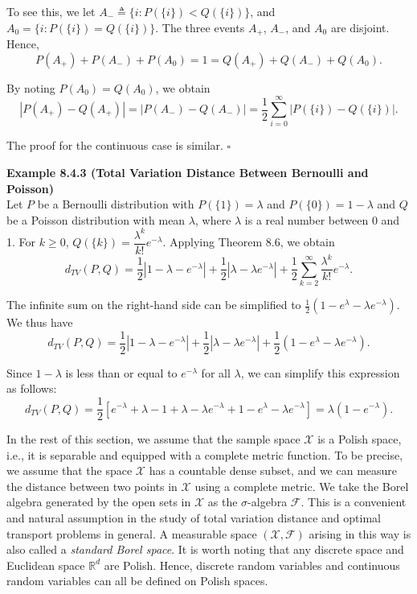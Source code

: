 To see this, we let $A_-\triangleq \{i : P(\{i\})<Q(\{i\})\}$, and $A_0=\{i : P(\{i\})=Q(\{i\})\}$. The three events $A_+$, $A_-$, and $A_0$ are disjoint. Hence,
\[
P(A_+)+P(A_-)+P(A_0)=1=Q(A_+)+Q(A_-)+Q(A_0).
\]

By noting $P(A_0)=Q(A_0)$, we obtain
\[
|P(A_+)-Q(A_+)| = |P(A_-)-Q(A_-)| = \frac{1}{2}\sum_{i=0}^{\infty} |P(\{i\})-Q(\{i\})|.
\]

The proof for the continuous case is similar. \hfill $\square$

\textbf{Example 8.4.3 (Total Variation Distance Between Bernoulli and Poisson)} \\
Let $P$ be a Bernoulli distribution with $P(\{1\})=\lambda$ and $P(\{0\})=1-\lambda$ and $Q$ be a Poisson distribution with mean $\lambda$, where $\lambda$ is a real number between 0 and 1. For $k\ge 0$, $Q(\{k\})=\dfrac{\lambda^k}{k!}e^{-\lambda}$. Applying Theorem 8.6, we obtain
\[
d_{TV}(P,Q)
=
\frac{1}{2}|1-\lambda-e^{-\lambda}|
+
\frac{1}{2}|\lambda-\lambda e^{-\lambda}|
+
\frac{1}{2}\sum_{k=2}^{\infty} \frac{\lambda^k}{k!}e^{-\lambda}.
\]

The infinite sum on the right-hand side can be simplified to $\frac{1}{2}(1-e^{\lambda}-\lambda e^{-\lambda})$. We thus have
\[
d_{TV}(P,Q)
=
\frac{1}{2}|1-\lambda-e^{-\lambda}|
+
\frac{1}{2}|\lambda-\lambda e^{-\lambda}|
+
\frac{1}{2}(1-e^{\lambda}-\lambda e^{-\lambda}).
\]

Since $1-\lambda$ is less than or equal to $e^{-\lambda}$ for all $\lambda$, we can simplify this expression as follows:
\[
d_{TV}(P,Q)
=
\frac{1}{2}\left[e^{-\lambda}+\lambda-1+\lambda-\lambda e^{-\lambda}+1-e^{\lambda}-\lambda e^{-\lambda}\right]
=
\lambda(1-e^{-\lambda}).
\]

In the rest of this section, we assume that the sample space $\mathcal{X}$ is a Polish space, i.e., it is separable and equipped with a complete metric function. To be precise, we assume that the space $\mathcal{X}$ has a countable dense subset, and we can measure the distance between two points in $\mathcal{X}$ using a complete metric. We take the Borel algebra generated by the open sets in $\mathcal{X}$ as the $\sigma$-algebra $\mathcal{F}$. This is a convenient and natural assumption in the study of total variation distance and optimal transport problems in general. A measurable space $(\mathcal{X},\mathcal{F})$ arising in this way is also called a \textit{standard Borel space}. It is worth noting that any discrete space and Euclidean space $\mathbb{R}^d$ are Polish. Hence, discrete random variables and continuous random variables can all be defined on Polish spaces.

